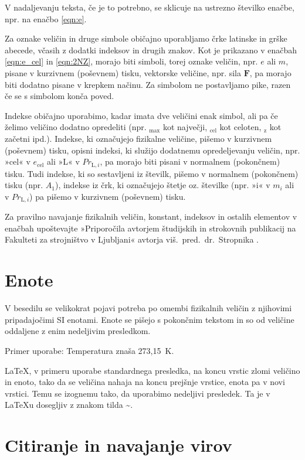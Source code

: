 V nadaljevanju teksta, če je to potrebno, se sklicuje na ustrezno številko 
enačbe, npr. na enačbo \eqref{eqn:e}.

Za oznake veličin in druge simbole običajno uporabljamo črke latinske in grške 
abecede, včasih z dodatki indeksov in drugih znakov. Kot je prikazano v enačbah 
\eqref{eqn:e_cel} in \eqref{eqn:2NZ}, morajo biti simboli, torej oznake veličin, 
npr. $e$ ali $m$, pisane v kurzivnem (poševnem) tisku, vektorske veličine, npr. sila $\bm{F}$, pa morajo biti dodatno pisane v krepkem načinu. Za simbolom ne postavljamo pike, razen če se s simbolom konča poved.

Indekse običajno uporabimo, kadar imata dve veličini enak simbol, ali pa če 
želimo veličino dodatno opredeliti (npr. $_{\text{max}}$ kot največji, 
$_{\text{cel}}$ kot celoten, $_{\text{z}}$ kot začetni ipd.). Indekse, ki 
označujejo fizikalne veličine, pišemo v kurzivnem (poševnem) tisku, opisni 
indeksi, ki služijo dodatnemu opredeljevanju veličin, npr. »cel« v 
$e_{\text{cel}}$ ali »L« v $Pr_{\text{L},i}$, pa morajo biti pisani v normalnem 
(pokončnem) tisku. Tudi indekse, ki so sestavljeni iz številk, pišemo v 
normalnem (pokončnem) tisku (npr. $A_1$), indekse iz črk, ki označujejo štetje 
oz. številke (npr. »i« v $m_i$ ali v $Pr_{\text{L},i}$) pa pišemo v kurzivnem 
(poševnem) tisku.

Za pravilno navajanje fizikalnih veličin, konstant, indeksov in ostalih 
elementov v enačbah upoštevajte »Priporočila avtorjem študijskih in strokovnih 
publikacij na Fakulteti za strojništvo v Ljubljani« avtorja 
viš.~pred.~dr.~Stropnika \cite{stropnik_1997}.

\section{Enote}\label{sec:enote}

V besedilu se velikokrat pojavi potreba po omembi fizikalnih veličin z njihovimi pripadajočimi SI enotami.  
Enote se pišejo s pokončnim tekstom in so od veličine oddaljene z enim nedeljivim presledkom.

Primer uporabe: Temperatura znaša 273,15~K.

\LaTeX, v primeru uporabe standardnega presledka, na koncu vrstic zlomi veličino in enoto, tako da se veličina nahaja na koncu prejšnje vrstice, enota pa v novi vrstici. Temu se izognemu tako, da uporabimo nedeljivi presledek. Ta je v \LaTeX u dosegljiv z znakom tilda \textbf{\~}.

\section{Citiranje in navajanje virov}\label{sec:citiranje}

